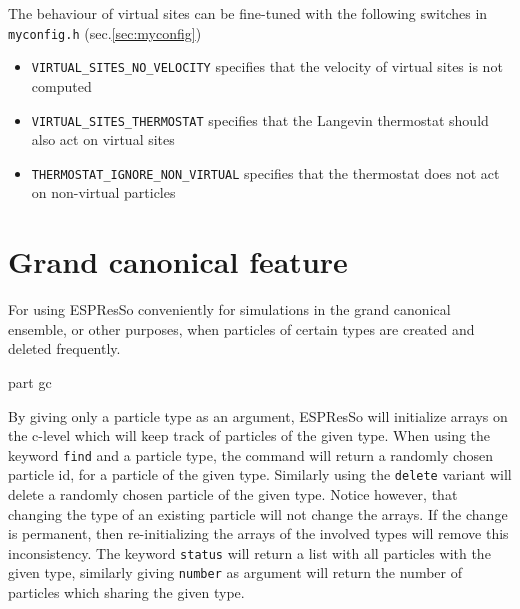 The behaviour of virtual sites can be fine-tuned with the following
switches in \texttt{myconfig.h} (sec.\ref{sec:myconfig})
\begin{itemize}
\item \texttt{VIRTUAL_SITES_NO_VELOCITY} specifies that the velocity
  of virtual sites is not computed
\item \texttt{VIRTUAL_SITES_THERMOSTAT} specifies that the Langevin
  thermostat should also act on virtual sites
\item \texttt{THERMOSTAT_IGNORE_NON_VIRTUAL} specifies that the
  thermostat does not act on non-virtual particles
\end{itemize}

\section{Grand canonical feature}
For using ESPResSo conveniently for simulations in the grand canonical ensemble, or
other purposes, when particles of certain types are created and deleted frequently.

\begin{essyntax}
part gc
\begin{features}
\end{features}

\end{essyntax}
By giving only a particle type as an argument, ESPResSo will initialize arrays on the
c-level which will keep track of particles of the given type. When using the keyword
\texttt{find} and a particle type, the command will return a randomly chosen particle
id, for a particle of the given type. Similarly using the \texttt{delete} variant will
delete a randomly chosen particle of the given type.  Notice however, that changing
the type of an existing particle will not change the arrays. If the change is
permanent, then re-initializing the arrays of the involved types will remove this
inconsistency.
The keyword \texttt{status} will return a list with all particles with the given type,
similarly giving \texttt{number} as argument will return the number of particles
which sharing the given type.
